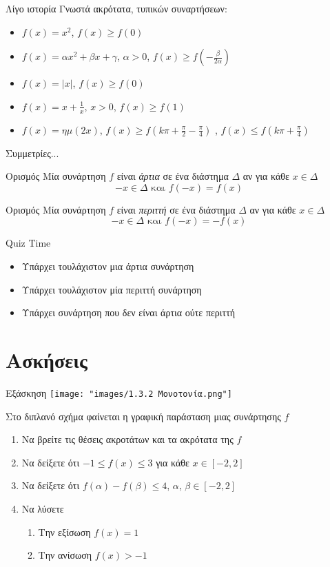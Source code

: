 \documentclass[greek]{beamer}
\begin{document}
\begin{frame}{Λίγο ιστορία}
 Γνωστά ακρότατα, τυπικών συναρτήσεων:
 \begin{itemize}
  \item $f(x)=x^2$\pause, $f(x)\ge f(0)$ \pause
  \item $f(x)=αx^2+βx+γ$, $α>0$\pause, $f(x)\ge f(-\frac{β}{2α})$ \pause
  \item $f(x)=|x|$\pause, $f(x)\ge f(0)$ \pause
  \item $f(x)=x+\frac{1}{x}$, $x>0$\pause, $f(x)\ge f(1)$
  \item $f(x)=ημ(2x)$\pause, $f(x)\ge f(k\pi + \frac{\pi}{2} - \frac{\pi}{4})$ \pause, $f(x)\le f(k\pi + \frac{\pi}{4})$
 \end{itemize}
\end{frame}

\begin{frame}{Συμμετρίες...}
 \begin{block}{Ορισμός}
  Μία συνάρτηση $f$ είναι \emph{άρτια} σε ένα διάστημα $Δ$ αν για κάθε  $ x\in Δ$
  $$-x\in Δ \text{ και } f(-x)=f(x)$$
 \end{block} \pause
 \begin{block}{Ορισμός}
  Μία συνάρτηση $f$ είναι \emph{περιττή} σε ένα διάστημα $Δ$ αν για κάθε  $ x\in Δ$
  $$-x\in Δ \text{ και } f(-x)=-f(x)$$
 \end{block}
\end{frame}

\begin{frame}{Quiz Time}
 \begin{itemize}
  \item Υπάρχει τουλάχιστον μια άρτια συνάρτηση \pause
  \item Υπάρχει τουλάχιστον μία περιττή συνάρτηση \pause
  \item Υπάρχει συνάρτηση που δεν είναι άρτια ούτε περιττή
 \end{itemize}
\end{frame}

\section{Ασκήσεις}
\begin{frame}{Εξάσκηση}
\centering
\texttt{[image: "images/1.3.2 Μονοτονία.png"]}

 Στο διπλανό σχήμα φαίνεται η γραφική παράσταση μιας συνάρτησης $f$
 \begin{enumerate}
  \item Να βρείτε τις θέσεις ακροτάτων και τα ακρότατα της $f$\pause
  \item Να δείξετε ότι $-1\le f(x) \le 3$ για κάθε $x\in[-2,2]$\pause
  \item Να δείξετε ότι $f(α)-f(β)\le 4$, $α$, $β\in[-2,2]$ \pause
  \item Να λύσετε
        \begin{enumerate}
         \item Την εξίσωση $f(x)=1$ \pause
         \item Την ανίσωση $f(x)>-1$
        \end{enumerate}
 \end{enumerate}
\end{frame}
\end{document}
